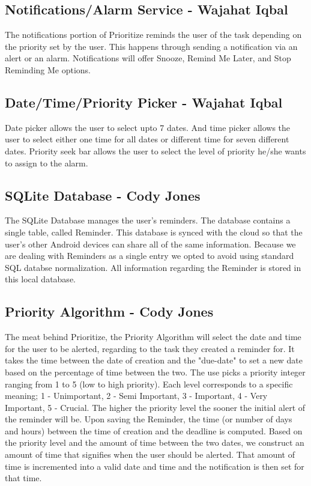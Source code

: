 \documentclass[12pt]{article}
\begin{document}
\subsection{Notifications/Alarm Service - Wajahat Iqbal}
The notifications portion of Prioritize reminds the user of the task depending on the priority set by the user. This happens through sending a notification via an alert or an alarm.  Notifications will offer Snooze, Remind Me Later, and Stop Reminding Me options. 

\subsection{Date/Time/Priority Picker - Wajahat Iqbal}
Date picker allows the user to select upto 7 dates. And time picker allows the user to select either one time for all dates or different time for seven different dates. Priority seek bar allows the user to select the level of priority he/she wants to assign to the alarm. 

\subsection{SQLite Database - Cody Jones}
The SQLite Database manages the user's reminders. The database contains a single table, called Reminder. This database is synced with the cloud so that the user's other Android devices can share all of the same information. Because we are dealing with Reminders as a single entry we opted to avoid using standard SQL databse normalization. All information regarding the Reminder is stored in this local database. 


\subsection{Priority Algorithm - Cody Jones}
The meat behind Prioritize, the Priority Algorithm will select the date and time for the user to be alerted, regarding to the task they created a reminder for. It takes the time between the date of creation and the "due-date" to set a new date based on the percentage of time between the two. The use picks a priority integer ranging from 1 to 5 (low to high priority). Each level corresponds to a specific meaning; 1 - Unimportant, 2 - Semi Important, 3 - Important, 4 - Very Important, 5 - Crucial. The higher the priority level the sooner the initial alert of the reminder will be. Upon saving the Reminder, the time (or number of days and hours) between the time of creation and the deadline is computed. Based on the priority level and the amount of time between the two dates, we construct an amount of time that signifies when the user should be alerted. That amount of time is incremented into a valid date and time and the notification is then set for that time. 
\end{document}

